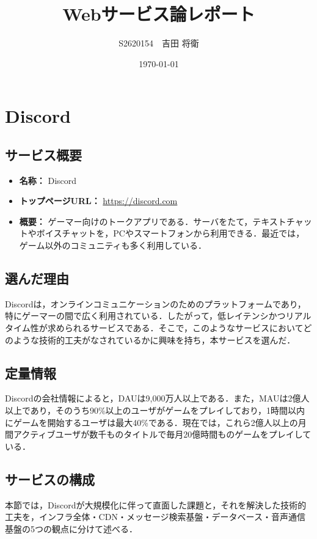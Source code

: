 \documentclass[a4paper,12pt]{article}
\title{Webサービス論レポート}
\author{S2620154　吉田 将衛}
\date{\today}
\begin{document}
\maketitle

\section{Discord}

\subsection{サービス概要}
\begin{itemize}
  \item \textbf{名称：} Discord
  \item \textbf{トップページURL：} \url{https://discord.com}
  \item \textbf{概要：} ゲーマー向けのトークアプリである．サーバをたて，テキストチャットやボイスチャットを，PCやスマートフォンから利用できる．最近では，ゲーム以外のコミュニティも多く利用している．
\end{itemize}

\subsection{選んだ理由}
Discordは，オンラインコミュニケーションのためのプラットフォームであり，特にゲーマーの間で広く利用されている．したがって，低レイテンシかつリアルタイム性が求められるサービスである．そこで，このようなサービスにおいてどのような技術的工夫がなされているかに興味を持ち，本サービスを選んだ．

\subsection{定量情報}
Discordの会社情報\cite{discord-company}によると，DAUは9,000万人以上である．また，MAUは2億人以上であり，そのうち90\%以上のユーザがゲームをプレイしており，1時間以内にゲームを開始するユーザは最大40\%である\cite{discord-ceo-2025}．現在では，これら2億人以上の月間アクティブユーザが数千ものタイトルで毎月20億時間ものゲームをプレイしている\cite{discord-blog-world-plays}．

\subsection{サービスの構成}

本節では，Discordが大規模化に伴って直面した課題と，それを解決した技術的工夫を，インフラ全体・CDN・メッセージ検索基盤・データベース・音声通信基盤の5つの観点に分けて述べる．
\end{document}

